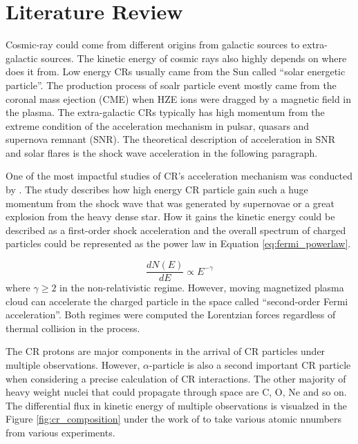 \chapter{Literature Review}


Cosmic-ray could come from different origins from galactic sources
to extra-galactic sources. The kinetic energy of cosmic rays also 
highly depends on where does it from. Low energy CRs usually came from 
the Sun called ``solar energetic particle''. The production process of 
soalr particle event mostly came from the coronal mass ejection (CME)
when HZE ions were dragged by a magnetic field in the plasma.
The extra-galactic CRs typically 
has high momentum from the extreme condition of the acceleration mechanism
in pulsar, quasars and supernova remnant (SNR). 
The theoretical description of acceleration in SNR and solar flares
is the shock wave acceleration in the following paragraph.

One of the most impactful studies of CR's acceleration mechanism 
was conducted by \cite{fermi1949origin}. 
The study describes how high energy CR particle gain such a huge 
momentum from the shock wave that was generated by supernovae 
or a great explosion from the heavy dense star. How it gains
the kinetic energy could be described as a first-order shock 
acceleration and the overall spectrum of charged particles could be
represented as the power law in Equation \ref{eq:fermi_powerlaw}.

\begin{equation}
    \frac{dN(E)}{dE} \propto E^{-\gamma}
    \label{eq:fermi_powerlaw}
\end{equation}
where $\gamma \geq 2$ in the non-relativistic regime.
However, moving magnetized plasma cloud can accelerate the charged particle in the space called ``second-order Fermi acceleration''.
Both regimes were computed the Lorentzian forces regardless of thermal collision in the process.

The CR protons are major components in the arrival of CR particles under multiple observations. However, $\alpha$-particle is also 
a second important CR particle when considering a precise calculation
of CR interactions. The other majority of heavy weight nuclei that could propagate through space are C, O, Ne and so on. 
The differential flux in kinetic energy of multiple observations is 
visualzed in the Figure \ref{fig:cr_composition} under the work of 
\cite{review_particle_physics2012} to take various atomic nnumbers 
from various experiments.

